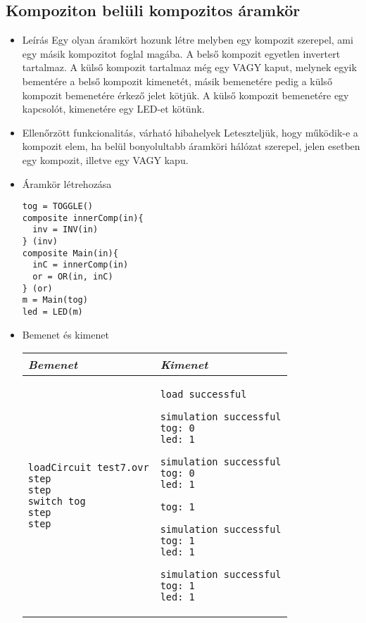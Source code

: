 \subsection{Kompoziton belüli kompozitos áramkör}
\begin{itemize}
\item Leírás\newline
Egy olyan áramkört hozunk létre melyben egy kompozit szerepel, ami egy másik kompozitot foglal magába. A belső kompozit egyetlen invertert tartalmaz. A külső kompozit tartalmaz még egy VAGY kaput, melynek egyik bementére a belső kompozit kimenetét, másik bemenetére pedig a külső kompozit bemenetére érkező jelet kötjük. A külső kompozit bemenetére egy kapcsolót, kimenetére egy LED-et kötünk.
\item Ellenőrzött funkcionalitás, várható hibahelyek\newline
Leteszteljük, hogy működik-e a kompozit elem, ha belül bonyolultabb áramköri hálózat szerepel, jelen esetben egy kompozit, illetve egy VAGY kapu.

\item Áramkör létrehozása

\begin{verbatim}
tog = TOGGLE()
composite innerComp(in){
  inv = INV(in)
} (inv)
composite Main(in){
  inC = innerComp(in)
  or = OR(in, inC)
} (or)
m = Main(tog)
led = LED(m)
\end{verbatim}

\item Bemenet és kimenet\newline

\begin{tabular}{|p{7cm}|p{7cm}|} 
\hline 
\textit{Bemenet} & \textit{Kimenet} \\ \hline
\begin{verbatim}
loadCircuit test7.ovr
step
step
switch tog
step
step
\end{verbatim}
& 
\begin{verbatim}
load successful

simulation successful
tog: 0
led: 1

simulation successful
tog: 0
led: 1

tog: 1

simulation successful
tog: 1
led: 1

simulation successful
tog: 1
led: 1
\end{verbatim}
\\ \hline
\end{tabular}

\end{itemize}


